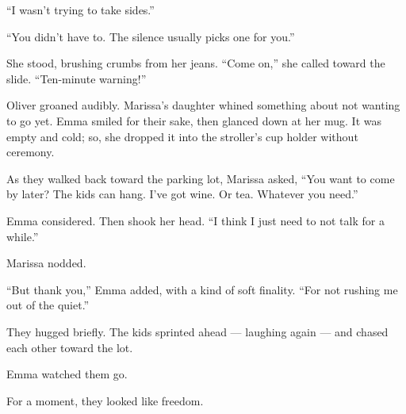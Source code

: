 ``I wasn’t trying to take sides.''

``You didn’t have to. The silence usually picks one for you.''

She stood, brushing crumbs from her jeans. ``Come on,'' she called toward the slide. ``Ten-minute warning!''

Oliver groaned audibly. 
Marissa’s daughter whined something about not wanting to go yet. 
Emma smiled for their sake, then glanced down at her mug. 
It was empty and cold; so, she dropped it into the stroller’s cup holder without ceremony.

As they walked back toward the parking lot, Marissa asked, ``You want to come by later? The kids can hang. 
I’ve got wine. Or tea. Whatever you need.''

Emma considered. Then shook her head. ``I think I just need to not talk for a while.''

Marissa nodded.

``But thank you,'' Emma added, with a kind of soft finality. ``For not rushing me out of the quiet.''

They hugged briefly. 
The kids sprinted ahead --- laughing again --- and chased each other toward the lot.

Emma watched them go.

For a moment, they looked like freedom.

\medskip

